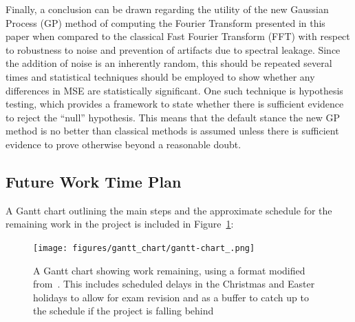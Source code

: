\documentclass[12pt]{article}
\begin{document}
    Finally, a conclusion can be drawn regarding the utility of the new Gaussian Process (GP) method of computing the Fourier Transform presented in this paper when compared to the classical Fast Fourier Transform (FFT) with respect to robustness to noise and prevention of artifacts due to spectral leakage.
    Since the addition of noise is an inherently random, this should be repeated several times and statistical techniques should be employed to show whether any differences in MSE are statistically significant.
    One such technique is hypothesis testing, which provides a framework to state whether there is sufficient evidence to reject the ``null'' hypothesis.
    This means that the default stance the new GP method is no better than classical methods is assumed unless there is sufficient evidence to prove otherwise beyond a reasonable doubt.

    \subsection{Future Work Time Plan}
    A Gantt chart outlining the main steps and the approximate schedule for the remaining work in the project is included in Figure~\ref{fig:gantt-chart_}:

    \begin{landscape}
        \begin{figure}[p] %
            \centering
            \texttt{[image: figures/gantt\_chart/gantt-chart\_.png]}
            \caption{A Gantt chart showing work remaining, using a format modified from~\cite{DataCampGanttChart2021}. This includes scheduled delays in the Christmas and Easter holidays to allow for exam revision and as a buffer to catch up to the schedule if the project is falling behind}
            \label{fig:gantt-chart_}
        \end{figure}
    \end{landscape}

%    

    \printbibliography
\end{document}
